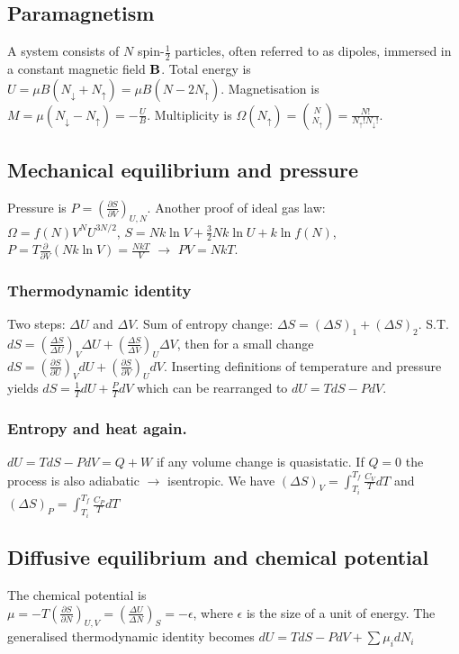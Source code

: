 \documentclass[11pt,twocolumn]{amsart}
\begin{document}
\subsection{Paramagnetism}
A system consists of $N$ spin-$\frac{1}{2}$ particles, often referred to as dipoles, immersed in a constant magnetic field $\vb{B}$. Total energy is $U=\mu B(N_\downarrow + N_\uparrow) = \mu B (N-2N_\uparrow)$. Magnetisation is $M=\mu(N_\downarrow - N_\uparrow) = -\frac{U}{B}$. Multiplicity is $\Omega(N_\uparrow) = \binom{N}{N_\uparrow}=\frac{N!}{N_\uparrow!N_\downarrow!}$.
\subsection{Mechanical equilibrium and pressure}
Pressure is $P = \left(\frac{\partial S}{\partial V} \right)_{U,N}$. Another proof of ideal gas law:\\ $\Omega = f(N)V^NU^{3N/2}$, $S = Nk\ln V + \frac{3}{2}Nk \ln U + k \ln f(N)$, $P=T \frac{\partial}{\partial V}(Nk\ln V) = \frac{NkT}{V}$ $\rightarrow$ $PV = NkT$.
\subsubsection{Thermodynamic identity}
Two steps: $\Delta U$ and $\Delta V$. Sum of entropy change: $\Delta S = (\Delta S)_1 + (\Delta S)_2$. S.T. $dS = \left(\frac{\Delta S}{\Delta U}\right)_V \Delta U + \left(\frac{\Delta S}{\Delta V}\right)_U \Delta V$, then for a small change $dS = \left(\frac{\partial S}{\partial U}\right)_V d U + \left(\frac{\partial S}{\partial V}\right)_U d V$. Inserting definitions of temperature and pressure yields $dS = \frac{1}{T}dU + \frac{P}{T}dV$ which can be rearranged to $dU = TdS - PdV$.
\subsubsection{Entropy and heat again.}
$dU = TdS - PdV = Q + W$ if any volume change is quasistatic. If $Q = 0$ the process is also adiabatic $\rightarrow$ isentropic. We have $(\Delta S)_V = \int_{T_i}^{T_f}\frac{C_V}{T}dT$ and  $(\Delta S)_P = \int_{T_i}^{T_f}\frac{C_P}{T}dT$
\subsection{Diffusive equilibrium and chemical potential}
The chemical potential is\\ $\mu = -T\left(\frac{\partial S}{\partial N}\right)_{U,V} = \left( \frac{\Delta U}{\Delta N}\right)_S = -\epsilon$, where $\epsilon$ is the size of a unit of energy. The generalised thermodynamic identity becomes $dU = TdS - PdV + \sum \mu_i dN_i$
\end{document}

